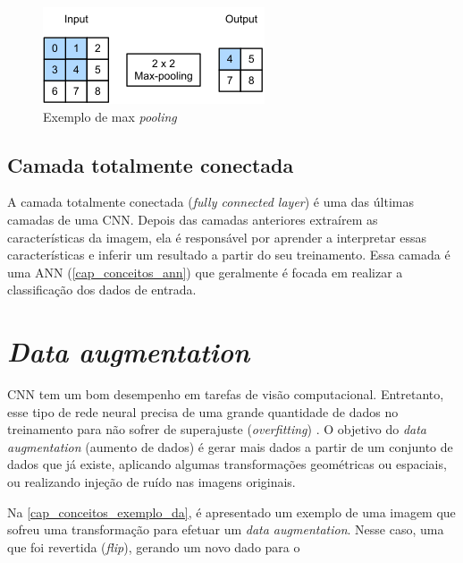 \begin{figure}[htb]
	\begin{center}
		\includegraphics[scale=1.0]{Imagens/maxpooling}
	\end{center}
	\caption {\label{exemplo_pooling} Exemplo de max \textit{pooling}}
\end{figure}

\subsection{Camada totalmente conectada}\label{cap_conceitos_cnn_totalmente}
A camada totalmente conectada (\textit{fully connected layer}) é uma das últimas camadas de uma CNN.
Depois das camadas anteriores extraírem as características da imagem, ela é responsável por
aprender a interpretar essas características e inferir um resultado a partir do seu treinamento.
Essa camada é uma ANN (\autoref{cap_conceitos_ann}) que geralmente é focada em realizar a classificação dos dados
de entrada.

\section{\textit{Data augmentation}}\label{cap_conceitos_data_augmentation}
CNN tem um bom desempenho em tarefas de visão computacional. Entretanto, esse tipo de rede neural precisa de uma
grande quantidade de dados no treinamento para não sofrer de superajuste (\textit{overfitting})
\cite{shorten2019survey}.
O objetivo do \textit{data augmentation} (aumento de dados) é gerar mais dados a partir de um conjunto de dados
que já existe, aplicando algumas transformações geométricas ou espaciais, ou realizando injeção de ruído nas imagens
originais.

Na \autoref{cap_conceitos_exemplo_da}, é apresentado um exemplo de uma imagem que sofreu uma transformação para efetuar
um \textit{data augmentation}.
Nesse caso, uma que foi revertida (\textit{flip}), gerando um novo dado para o 

